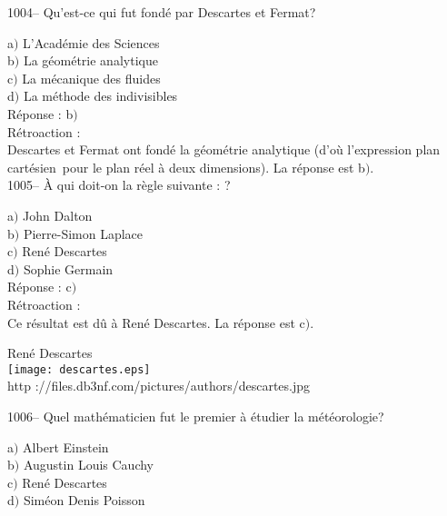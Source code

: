 ﻿\documentclass[letterpaper, 12pt]{article}
\begin{document}
1004-- Qu'est-ce qui fut fond\'e par Descartes et Fermat?

a$)$ L'Acad\'emie des Sciences \\
b$)$ La g\'eom\'etrie analytique \\
c$)$ La m\'ecanique des fluides \\
d$)$ La m\'ethode des indivisibles\\

R\'eponse : b$)$\\

R\'etroaction : \\
Descartes et Fermat ont fond\'e la g\'eom\'etrie analytique (d'o\`u
l'expression \og plan cart\'esien\fg\ pour le plan r\'eel \`a deux
dimensions).
La r\'eponse est b$)$.\\

1005-- \`A qui doit-on la r\`egle suivante : \fg ?

a$)$ John Dalton \\
b$)$ Pierre-Simon Laplace \\
c$)$ Ren\'e Descartes \\
d$)$ Sophie Germain\\

R\'eponse : c$)$\\

R\'etroaction : \\
Ce r\'esultat est d\^u \`a Ren\'e Descartes.
La r\'eponse est c$)$.\\

        \begin{center}
        Ren\'e Descartes\\
    \texttt{[image: descartes.eps]}\\
        {\footnotesize http
://files.db3nf.com/pictures/authors/descartes.jpg}
    \end{center}

1006-- Quel math\'ematicien fut le premier \`a \'etudier la
m\'et\'eorologie?

a$)$ Albert Einstein \\
b$)$ Augustin Louis Cauchy \\
c$)$ Ren\'e Descartes \\
d$)$ Sim\'eon Denis Poisson\\
\end{document}
